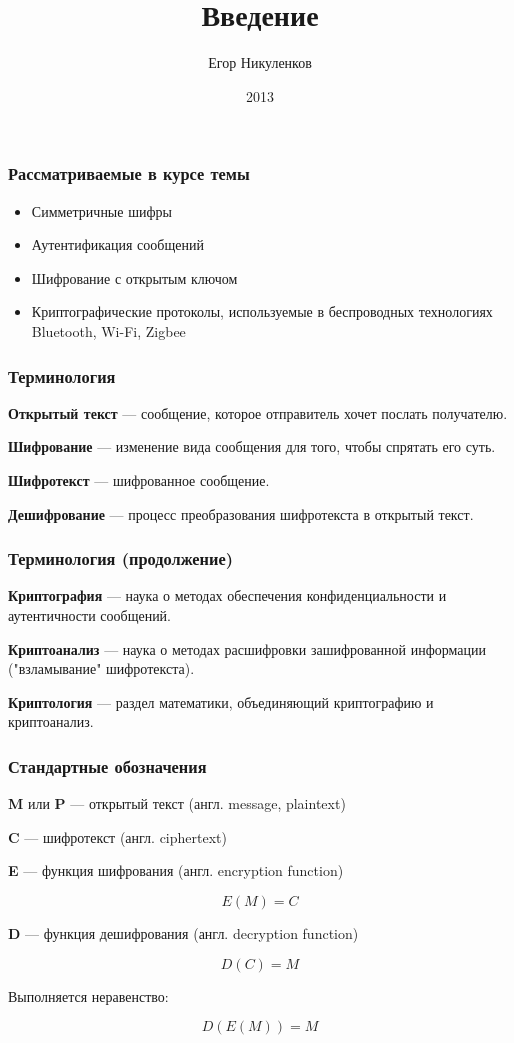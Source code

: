 \documentclass{beamer}
\title{Введение}
\author{Егор Никуленков}
\institute{ВГУ}
\date{2013}
\newcommand{\define}[2]{{\bf #1} --- #2.\vspace{1em}}
\begin{document}
\frame{\titlepage}

\begin{frame}
  \frametitle{Рассматриваемые в курсе темы}

  \begin{itemize}
    \item{Симметричные шифры}
    \item{Аутентификация сообщений}
    \item{Шифрование с открытым ключом}
    \item{Криптографические протоколы, используемые в беспроводных технологиях Bluetooth, Wi-Fi, Zigbee}
  \end{itemize}
\end{frame}


\begin{frame}
  \frametitle{Терминология}

  \define{Открытый текст} {сообщение, которое отправитель хочет послать получателю}

  \define{Шифрование} {изменение вида сообщения для того, чтобы спрятать его суть}

  \define{Шифротекст} {шифрованное сообщение}

  \define{Дешифрование} {процесс преобразования шифротекста в открытый текст}
\end{frame}


\begin{frame}
  \frametitle{Терминология (продолжение)}

  \define{Криптография} {наука о методах обеспечения конфиденциальности и аутентичности сообщений}

  \define{Криптоанализ} {наука о методах расшифровки зашифрованной информации ("взламывание" шифротекста)}

  \define{Криптология} {раздел математики, объединяющий криптографию и криптоанализ}
\end{frame}


\begin{frame}
  \frametitle{Стандартные обозначения}

  \textbf{M} или \textbf{P} --- открытый текст (англ. message, plaintext)

  \textbf{C} --- шифротекст (англ. ciphertext)

  \vspace{1em}

  \textbf{E} --- функция шифрования (англ. encryption function)

  \[E(M)=C\]

  \vspace{1em}

  \textbf{D} --- функция дешифрования (англ. decryption function)

  \[D(C)=M\]

  \vspace{1em}

  Выполняется неравенство:
  
  \[D(E(M))=M\]
\end{frame}
\end{document}
